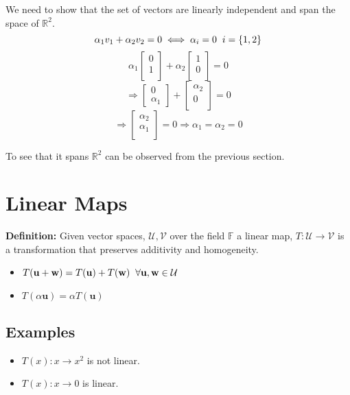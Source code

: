 \documentclass[a4paper]{article}
\begin{document}
We need to show that the set of vectors are linearly independent and span the space of $\mathbb{R}^{2}$.
$$
\alpha_{1}v_{1} + \alpha_{2}v_{2} = 0 \iff \alpha_{i} = 0\hspace{2mm}i = \{1,2\}
$$
$$
\alpha_{1}\begin{bmatrix}0\\1\\\end{bmatrix} + \alpha_{2}\begin{bmatrix}1\\0\\\end{bmatrix} = 0
$$
$$
\Rightarrow
\begin{bmatrix}0\\\alpha_{1}\end{bmatrix} + \begin{bmatrix}\alpha_{2}\\0\\\end{bmatrix} = 0 
$$
$$
\Rightarrow
\begin{bmatrix}\alpha_{2}\\\alpha_{1}\\\end{bmatrix} = 0 \Rightarrow \alpha_{1} = \alpha_{2} = 0
$$

To see that it spans $\mathbb{R}^{2}$ can be observed from the previous section.\\
\section{Linear Maps}
\textbf{Definition:} Given vector spaces, $\mathcal{U,V}$ over the field $\mathbb{F}$ a linear map, $T: \mathcal{U}\rightarrow\mathcal{V}$ is a transformation that preserves additivity and homogeneity.

\begin{itemize}
\item $T(\mathbf{u + w}) = T(\mathbf{u}) + T(\mathbf{w})\hspace{2mm} \forall\mathbf{u,w}\in\mathcal{U}$
\item $T(\alpha\mathbf{u}) = \alpha T(\mathbf{u})$
\end{itemize}

\subsection{Examples}
\begin{itemize}
\item $T(x): x\rightarrow x^{2}$ is not linear.
\item $T(x): x\rightarrow 0$ is linear.
\end{itemize}
\end{document}
